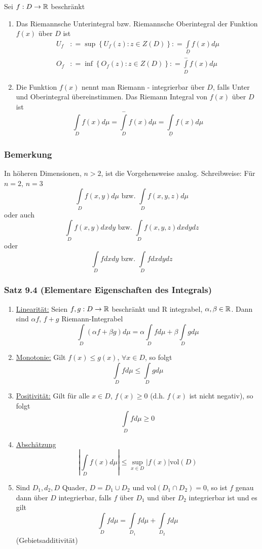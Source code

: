 \begin{definition}{9.3}
Sei $f:D\to\mathbb{R}$ beschränkt
\begin{enumerate}
\item Das Riemannsche Unterintegral bzw. Riemannsche Oberintegral der Funktion $f\left( x\right)$ über $D$ ist
\begin{align*}
{U_f}&: = \sup \left\{ {{U_f}\left( z \right):z \in Z\left( D \right)} \right\}: = \int\limits_{\underline{D}} {f(x)d\mu } \\
{O_f}&: = \inf \left\{ {{O_f}\left( z \right):z \in Z\left( D \right)} \right\}: = \int\limits_D^ -  {f(x)d\mu }
\end{align*}
\item Die Funktion $f(x)$ nennt man Riemann - integrierbar über $D$, falls Unter und Oberintegral übereinstimmen. Das Riemann Integral von $f(x)$ über $D$ ist \[\int\limits_D {f(x)d\mu  = \int\limits_D^ -  {f(x)d\mu  = } \int\limits_{\underline{D}} {f(x)d\mu } } \]
\end{enumerate}
\end{definition}

\subsubsection*{Bemerkung}
In höheren Dimensionen, $n >2$, ist die Vorgehensweise analog. Schreibweise: Für $n=2$, $n=3$
\[\int\limits_D {f\left( {x,y} \right)d\mu {\text{ bzw. }}} \int\limits_D {f\left( {x,y,z} \right)d\mu } \]
oder auch
\[\int\limits_D {f\left( {x,y} \right)dxdy{\text{ bzw. }}} \int\limits_D {f\left( {x,y,z} \right)dxdydz} \]
oder
\[\int\limits_D {fdxdy{\text{ bzw. }}} \int\limits_D {fdxdydz} \]

\subsubsection*{Satz 9.4 (Elementare Eigenschaften des Integrals)}
\begin{enumerate}
\item \underline{Linearität:} Seien $f,g: D\to\mathbb{R}$ beschränkt und R integrabel, $\alpha,\beta\in\mathbb{R}$. Dann sind $\alpha f$, $f+g$ Riemann-Integrabel
\[\int\limits_D {\left( {\alpha f + \beta g} \right)d\mu  = \alpha \int\limits_D {fd\mu }  + \beta \int\limits_D {gd\mu } } \]
\item \underline{Monotonie:} Gilt $f(x)\leq g(x)$, $\forall x\in D$, so folgt \[\int\limits_D {fd\mu }  \le \int\limits_D {gd\mu } \]
\item\underline{Positivität:} Gilt für alle $x\in D$, $f(x)\geq 0$ (d.h. $f(x)$ ist nicht negativ), so folgt \[\int\limits_D {fd\mu }  \ge 0\]
\item \underline{Abschätzung} \[\left| {\int\limits_D {f(x)d\mu } } \right| \le \mathop {\sup }\limits_{x \in D} \left| {f(x)} \right|{\text{vol}}\left( D \right)\]
\item Sind $D_1,d_2,D$ Quader, $D=D_1\cup D_2$ und $\text{vol}\left( D_1\cap D_2\right)=0$, so ist $f$ genau dann über $D$ integrierbar, falls $f$ über $D_1$ und über $D_2$ integrierbar ist und es gilt \[\int\limits_D {fd\mu }  = \int\limits_{{D_1}} {fd\mu }  + \int\limits_{{D_2}} {fd\mu } \](Gebietsadditivität)
\end{enumerate}

